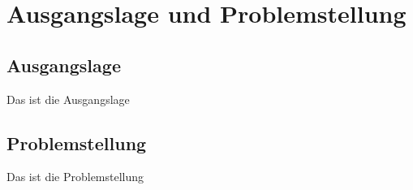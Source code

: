 \chapter{Ausgangslage und Problemstellung}

\section{Ausgangslage}
Das ist die Ausgangslage

\section{Problemstellung}
Das ist die Problemstellung